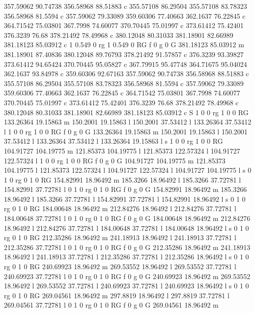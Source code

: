 357.59062 90.74738 
356.58968 88.51883 c 
355.57108 86.29504 
355.57108 83.78323 
356.58968 81.5594 c 
357.59062 79.33089 
359.60306 77.40663 
362.1637 76.22845 c 
364.71542 75.03801 
367.7998 74.60077 
370.70445 75.01997 c 
373.61412 75.42401 
376.3239 76.68 
378.21492 78.49968 c 
380.12048 80.31033 
381.18901 82.66989 
381.18123 85.03912 c 
1 0.549 0 rg 1 0.549 0 RG f 
0 g 0 G 
381.18123 85.03912 m 
381.18901 87.40836 
380.12048 89.76793 
378.21492 91.57857 c 
376.3239 93.39827 
373.61412 94.65424 
370.70445 95.05827 c 
367.79915 95.47748 
364.71675 95.04024 
362.1637 93.84978 c 
359.60306 92.67163 
357.59062 90.74738 
356.58968 88.51883 c 
355.57108 86.29504 
355.57108 83.78323 
356.58968 81.5594 c 
357.59062 79.33089 
359.60306 77.40663 
362.1637 76.22845 c 
364.71542 75.03801 
367.7998 74.60077 
370.70445 75.01997 c 
373.61412 75.42401 
376.3239 76.68 
378.21492 78.49968 c 
380.12048 80.31033 
381.18901 82.66989 
381.18123 85.03912 c 
S 
1 0 0 rg 1 0 0 RG 
133.26364 19.15863 m 
150.2001 19.15863 l 
150.2001 37.53412 l 
133.26364 37.53412 l 
1 0 0 rg 1 0 0 RG f 
0 g 0 G 
133.26364 19.15863 m 
150.2001 19.15863 l 
150.2001 37.53412 l 
133.26364 37.53412 l 
133.26364 19.15863 l 
s 
1 0 0 rg 1 0 0 RG 
104.91727 104.19775 m 
121.85373 104.19775 l 
121.85373 122.57324 l 
104.91727 122.57324 l 
1 0 0 rg 1 0 0 RG f 
0 g 0 G 
104.91727 104.19775 m 
121.85373 104.19775 l 
121.85373 122.57324 l 
104.91727 122.57324 l 
104.91727 104.19775 l 
s 
0 1 0 rg 0 1 0 RG 
154.82991 18.96492 m 
185.3266 18.96492 l 
185.3266 37.72781 l 
154.82991 37.72781 l 
0 1 0 rg 0 1 0 RG f 
0 g 0 G 
154.82991 18.96492 m 
185.3266 18.96492 l 
185.3266 37.72781 l 
154.82991 37.72781 l 
154.82991 18.96492 l 
s 
0 1 0 rg 0 1 0 RG 
184.00648 18.96492 m 
212.84276 18.96492 l 
212.84276 37.72781 l 
184.00648 37.72781 l 
0 1 0 rg 0 1 0 RG f 
0 g 0 G 
184.00648 18.96492 m 
212.84276 18.96492 l 
212.84276 37.72781 l 
184.00648 37.72781 l 
184.00648 18.96492 l 
s 
0 1 0 rg 0 1 0 RG 
212.35286 18.96492 m 
241.18913 18.96492 l 
241.18913 37.72781 l 
212.35286 37.72781 l 
0 1 0 rg 0 1 0 RG f 
0 g 0 G 
212.35286 18.96492 m 
241.18913 18.96492 l 
241.18913 37.72781 l 
212.35286 37.72781 l 
212.35286 18.96492 l 
s 
0 1 0 rg 0 1 0 RG 
240.69923 18.96492 m 
269.53552 18.96492 l 
269.53552 37.72781 l 
240.69923 37.72781 l 
0 1 0 rg 0 1 0 RG f 
0 g 0 G 
240.69923 18.96492 m 
269.53552 18.96492 l 
269.53552 37.72781 l 
240.69923 37.72781 l 
240.69923 18.96492 l 
s 
0 1 0 rg 0 1 0 RG 
269.04561 18.96492 m 
297.8819 18.96492 l 
297.8819 37.72781 l 
269.04561 37.72781 l 
0 1 0 rg 0 1 0 RG f 
0 g 0 G 
269.04561 18.96492 m 
